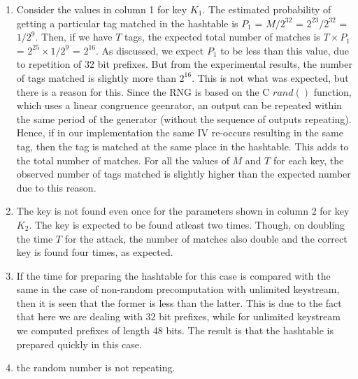 \begin{enumerate}
\item Consider the values in column 1 for key $K_1$. The estimated probability of getting a particular tag matched in the hashtable is $P_1$ = $M/2^{32}$ = $2^{23}/2^{32}$ = $1/2^{9}$. Then, if we have $T$ tags, the expected total number of matches is $T \times P_1$ = $2^{25} \times 1/2^{9}$ = $2^{16}$. As discussed, we expect $P_1$ to be less than this value, due to repetition of 32 bit prefixes. But from the experimental results, the number of tags matched is slightly more than $2^{16}$. This is not what was expected, but there is a reason for this.
Since the RNG is based on the C $rand()$ function, which uses a linear congruence geenrator, an output can be repeated within the same period of the generator (without the sequence of outputs repeating). Hence, if in our implementation the same IV re-occurs resulting in the same tag, then the tag is matched at the same place in the hashtable. This adds to the total number of matches. For all the values of $M$ and $T$ for each key, the observed number of tags matched is slightly higher than the expected number due to this reason.

\item The key is not found even once for the parameters shown in column 2 for key $K_2$. The key is expected to be found atleast two times. Though, on doubling the time $T$ for the attack, the number of matches also double and the correct key is found four times, as expected. 

\item If the time for preparing the hashtable for this case is compared with the same in the case of non-random precomputation with unlimited keystream, then it is seen that the former is less than the latter. This is due to the fact that here we are dealing with 32 bit prefixes, while for unlimited keystream we computed prefixes of length 48 bits. The result is that the hashtable is prepared quickly in this case. 

\item the random number is not repeating. 
\end{enumerate}